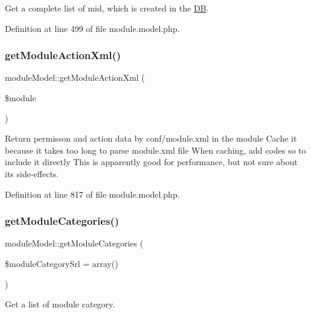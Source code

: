Get a complete list of mid, which is created in the \hyperlink{classDB}{DB}. 



Definition at line 499 of file module.\+model.\+php.

\hypertarget{classmoduleModel_a2d53da77f2504357f99b93a2ad09981a}{}\label{classmoduleModel_a2d53da77f2504357f99b93a2ad09981a} 
\subsubsection{\texorpdfstring{get\+Module\+Action\+Xml()}{getModuleActionXml()}}
{\footnotesize\ttfamily module\+Model\+::get\+Module\+Action\+Xml (\begin{DoxyParamCaption}\item[{}]{\$module }\end{DoxyParamCaption})}



Return permisson and action data by conf/module.\+xml in the module Cache it because it takes too long to parse module.\+xml file When caching, add codes so to include it directly This is apparently good for performance, but not sure about its side-\/effects. 



Definition at line 817 of file module.\+model.\+php.

\hypertarget{classmoduleModel_a253e39c41e241e2f3fa914ce5d915963}{}\label{classmoduleModel_a253e39c41e241e2f3fa914ce5d915963} 
\subsubsection{\texorpdfstring{get\+Module\+Categories()}{getModuleCategories()}}
{\footnotesize\ttfamily module\+Model\+::get\+Module\+Categories (\begin{DoxyParamCaption}\item[{}]{\$module\+Category\+Srl = {\ttfamily array()} }\end{DoxyParamCaption})}



Get a list of module category. 



